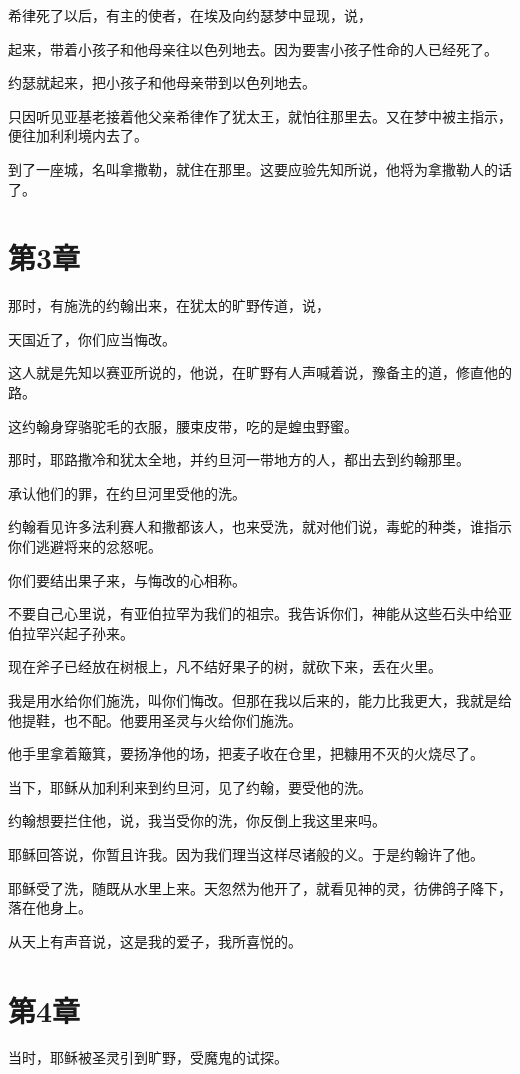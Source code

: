 \documentclass[12pt,oneside]{book}
\begin{document}
希律死了以后，有主的使者，在埃及向约瑟梦中显现，说，

起来，带着小孩子和他母亲往以色列地去。因为要害小孩子性命的人已经死了。

约瑟就起来，把小孩子和他母亲带到以色列地去。

只因听见亚基老接着他父亲希律作了犹太王，就怕往那里去。又在梦中被主指示，便往加利利境内去了。

到了一座城，名叫拿撒勒，就住在那里。这要应验先知所说，他将为拿撒勒人的话了。


\chapter{第3章}
那时，有施洗的约翰出来，在犹太的旷野传道，说，

天国近了，你们应当悔改。

这人就是先知以赛亚所说的，他说，在旷野有人声喊着说，豫备主的道，修直他的路。

这约翰身穿骆驼毛的衣服，腰束皮带，吃的是蝗虫野蜜。

那时，耶路撒冷和犹太全地，并约旦河一带地方的人，都出去到约翰那里。

承认他们的罪，在约旦河里受他的洗。

约翰看见许多法利赛人和撒都该人，也来受洗，就对他们说，毒蛇的种类，谁指示你们逃避将来的忿怒呢。

你们要结出果子来，与悔改的心相称。

不要自己心里说，有亚伯拉罕为我们的祖宗。我告诉你们，神能从这些石头中给亚伯拉罕兴起子孙来。

现在斧子已经放在树根上，凡不结好果子的树，就砍下来，丢在火里。

我是用水给你们施洗，叫你们悔改。但那在我以后来的，能力比我更大，我就是给他提鞋，也不配。他要用圣灵与火给你们施洗。

他手里拿着簸箕，要扬净他的场，把麦子收在仓里，把糠用不灭的火烧尽了。

当下，耶稣从加利利来到约旦河，见了约翰，要受他的洗。

约翰想要拦住他，说，我当受你的洗，你反倒上我这里来吗。

耶稣回答说，你暂且许我。因为我们理当这样尽诸般的义。于是约翰许了他。

耶稣受了洗，随既从水里上来。天忽然为他开了，就看见神的灵，彷佛鸽子降下，落在他身上。

从天上有声音说，这是我的爱子，我所喜悦的。

\chapter{第4章}
当时，耶稣被圣灵引到旷野，受魔鬼的试探。
\end{document}

